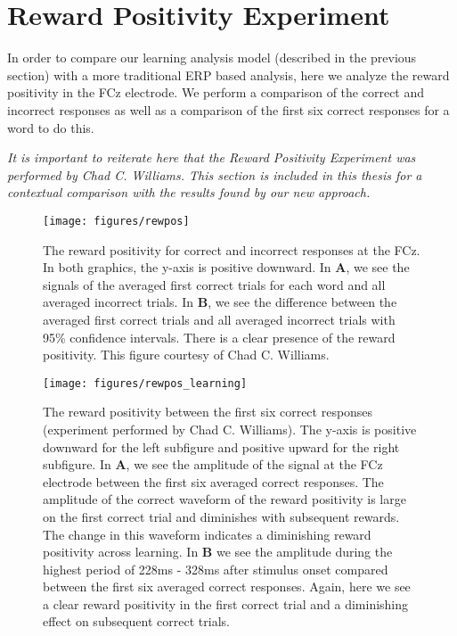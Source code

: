 \section{Reward Positivity Experiment}

In order to compare our learning analysis model (described in the previous 
section) with a more traditional ERP based analysis, here we analyze the reward 
positivity in the FCz electrode. We perform a comparison of the correct and 
incorrect responses as well as a comparison of the first six correct responses 
for a word to do this.

\emph{It is important to reiterate here that the Reward Positivity Experiment 
was performed by Chad C. Williams. This section is included in this thesis for 
a contextual comparison with the results found by our new approach.}

\begin{figure}[p]
  \centerline{
    \texttt{[image: figures/rewpos]}
  }
  \caption[Reward Positivity for Correct and Incorrect Responses]{
    The reward positivity for correct and incorrect responses at the FCz. In 
    both graphics, the y-axis is positive downward. In {\bf A}, we see the 
    signals of the averaged first correct trials for each word and all averaged 
    incorrect trials. In {\bf B}, we see the difference between the averaged 
    first correct trials and all averaged incorrect trials with 95\% confidence 
    intervals. There is a clear presence of the reward positivity. This figure 
    courtesy of Chad C. Williams.
  }
  \label{fig:rewpos}
\end{figure}

\begin{figure}[!p]
  \centerline{
    \texttt{[image: figures/rewpos\_learning]}
  }
  \caption[Reward Positivity between the First Six Correct Responses]{
    The reward positivity between the first six correct responses (experiment 
    performed by Chad C. Williams). The y-axis is positive downward for the 
    left subfigure and positive upward for the right subfigure. In {\bf A}, we 
    see the amplitude of the signal at the FCz electrode between the first six 
    averaged correct responses. The amplitude of the correct waveform of the 
    reward positivity is large on the first correct trial and diminishes with 
    subsequent rewards.  The change in this waveform indicates a diminishing 
    reward positivity across learning. In {\bf B} we see the amplitude during 
    the highest period of 228ms - 328ms after stimulus onset compared between 
    the first six averaged correct responses.  Again, here we see a clear 
    reward positivity in the first correct trial and a diminishing effect on 
    subsequent correct trials.
  }
  \label{fig:rewpos_learning}
\end{figure}

